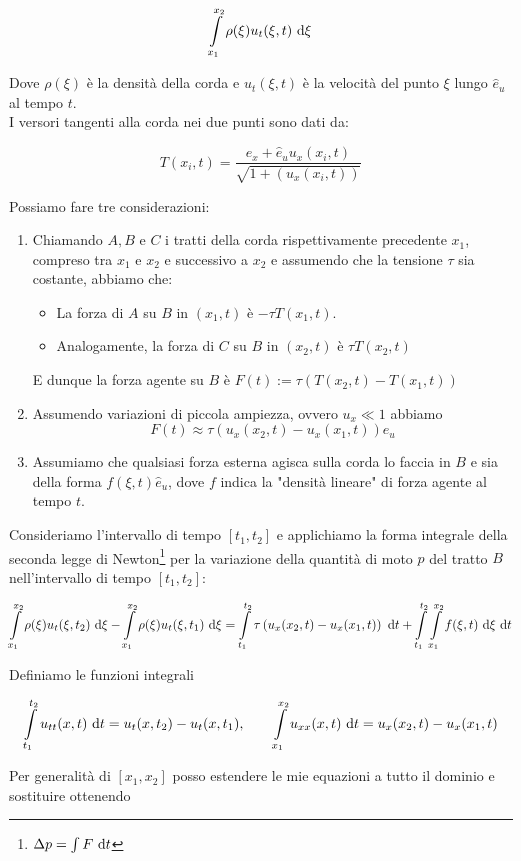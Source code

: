 \documentclass{article}
\begin{document}
\[ \intop_{x_1}^{x_2} \rho(\xi) u_t(\xi, t)\de \xi \]

Dove $\rho(\xi)$ è la densità della corda e $u_t(\xi,t)$ è la velocità del punto $\xi$ lungo $\hat{e}_u$ al tempo $t$.\\
I versori tangenti alla corda nei due punti sono dati da:

\[ T(x_i,t) = \frac{ \hat{e}_x + \hat{e}_u u_{x}(x_i,t) }{\sqrt{ 1+(u_{x}(x_i,t)) }} \]

Possiamo fare tre considerazioni:\begin{enumerate}
    \item Chiamando $A,B$ e $C$ i tratti della corda rispettivamente precedente $x_1$, compreso tra $x_1$ e $x_2$ e successivo a $x_2$ e assumendo che la tensione $\tau$ sia costante, abbiamo che:\begin{itemize}
        \item La forza di $A$ su $B$ in $(x_1,t)$ è $-\tau T(x_1, t)$.
        \item Analogamente, la forza di $C$ su $B$ in $(x_2,t)$ è $\tau T(x_2, t)$
    \end{itemize} 
    E dunque la forza agente su $B$ è $F(t) := \tau\left(T(x_2,t) - T(x_1,t)\right)$
    \item Assumendo variazioni di piccola ampiezza, ovvero $u_x \ll 1$ abbiamo
    \[ F(t) \approx \tau\left(u_x(x_2,t) - u_x(x_1,t)\right) \hat{e}_u \]
    \item Assumiamo che qualsiasi forza esterna agisca sulla corda lo faccia in $B$ e sia della forma $f(\xi,t)\hat{e}_u$, dove $f$ indica la "densità lineare" di forza agente al tempo $t$. 
\end{enumerate}
Consideriamo l'intervallo di tempo $[t_1, t_2]$ e applichiamo la forma integrale della seconda legge di Newton\footnote{$\Delta p = \int F\text{ d} t $} per la variazione della quantità di moto $p$ del tratto $B$ nell'intervallo di tempo $[t_1,t_2]$:

\[ \intop_{x_1}^{x_2} \rho(\xi) u_t(\xi, t_2)\de \xi - \intop_{x_1}^{x_2} \rho(\xi) u_t(\xi, t_1)\de \xi = \intop_{t_1}^{t_2} \tau\left(u_x(x_2,t) - u_x(x_1,t)\right) \de t + \intop_{t_1}^{t_2}\intop_{x_1}^{x_2} f(\xi,t) \de \xi \de t \]

Definiamo le funzioni integrali

\[ \intop_{t_1}^{t_2} u_{tt}(x, t) \de t = u_t(x,t_2) - u_t(x, t_1) ,\qquad \intop_{x_1}^{x_2} u_{xx}(x,t)\de t = u_x(x_2,t) - u_x(x_1, t) \]

Per generalità di $[x_1,x_2]$ posso estendere le mie equazioni a tutto il dominio e sostituire ottenendo
\end{document}
